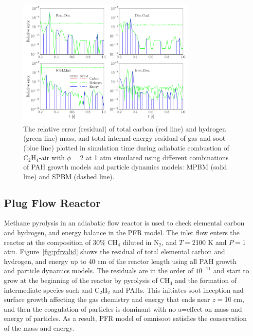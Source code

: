 \begin{figure}[H]
	\centering
	\includegraphics[width=0.8\textwidth]{Figures/Results/Validation/PSR/relerr_psr.pdf}
	\caption{The relative error (residual) of total carbon (red line) and hydrogen (green line) mass, and total internal energy residual of gas and soot (blue line) plotted in simulation time during adiabatic combustion of $\mathrm{C_2H_4}$-air with $\phi=2$ at 1 atm simulated using different combinations of PAH growth models and particle dynamics models: MPBM (solid line) and SPBM (dashed line).}
	\label{fig:psrvalid}
\end{figure}


\subsection{Plug Flow Reactor}
Methane pyrolysis in an adiabatic flow reactor is used to check elemental carbon and hydrogen, and energy balance in the PFR model. The inlet flow enters the reactor at the composition of 30\% $\mathrm{CH_4}$ diluted in $\mathrm{N_2}$, and $T=$2100 K and $P=$1 atm. Figure~\ref{fig:pfrvalid} shows the residual of total elemental carbon and hydrogen, and energy up to 40 cm of the reactor length using all PAH growth and particle dynamics models. The residuals are in the order of $10^{-11}$ and start to grow at the beginning of the reactor by pyrolysis of $\mathrm{CH_4}$ and the formation of intermediate species such and $\mathrm{C_2H_2}$ and PAHs. This initiates soot inception and surface growth affecting the gas chemistry and energy that ends near $z=$10 cm, and then the coagulation of particles is dominant with no a=effect on mass and energy of particles. As a result, PFR model of omnisoot satisfies the conservation of the mass and energy.



